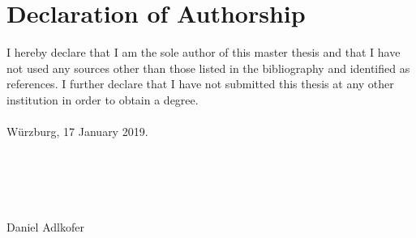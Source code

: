 

\chapter*{Declaration of Authorship}
I hereby declare that I am the sole author of this master thesis and that I have not used any sources other than those listed in the bibliography and identified as references.\newline
I further declare that I have not submitted this thesis at any other institution in order to obtain a degree.
\\\\
W\"{u}rzburg, 17 January 2019.
\\\\\\\\\\
\underline{\hspace{8cm}}\\
Daniel Adlkofer

